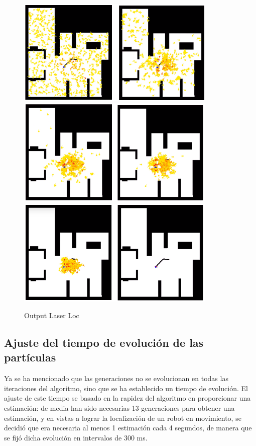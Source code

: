 \begin{figure}[H]
	\begin{center}
		\includegraphics[width=0.850\textwidth]{figures/lloutput1.png}
		\includegraphics[width=0.850\textwidth]{figures/lloutput2.png}
		\includegraphics[width=0.850\textwidth]{figures/lloutput3.png}
		\caption{Output Laser Loc}
		\label{fig.outputll}
		\end{center}
\end{figure}

\subsection{Ajuste del tiempo de evolución de las partículas}
Ya se ha mencionado que las generaciones no se evolucionan en todas las iteraciones del algoritmo, sino que se ha establecido un tiempo de evolución. El ajuste de este tiempo se basado en la rapidez del algoritmo en proporcionar una estimación: de media han sido necesarias 13 generaciones para obtener una estimación, y en vistas a lograr la localización de un robot en movimiento, se decidió que era necesaria al menos 1 estimación cada 4 segundos, de manera que se fijó dicha evolución en intervalos de 300 ms. 

